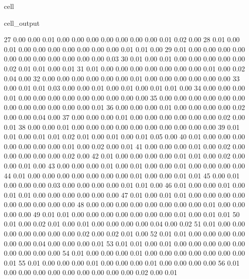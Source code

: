 \documentclass[letterpaper,10pt,english]{jupyterBook}
\begin{document}
\begin{sphinxuseclass}{cell}
\begin{sphinxVerbatimOutput}
\begin{sphinxuseclass}{cell_output}
\begin{sphinxVerbatim}[commandchars=\\\{\}]
        27	0.00 	0.00 	0.01 	0.00 	0.00 	0.00 	0.00 	0.00 	0.00 	0.00 	0.01 	0.02 	0.00
        28	0.01 	0.00 	0.01 	0.00 	0.00 	0.00 	0.00 	0.00 	0.00 	0.00 	0.01 	0.01 	0.00
        29	0.01 	0.00 	0.00 	0.00 	0.00 	0.00 	0.00 	0.00 	0.00 	0.00 	0.00 	0.00 	0.03
        30	0.01 	0.00 	0.01 	0.00 	0.00 	0.00 	0.00 	0.00 	0.02 	0.01 	0.01 	0.00 	0.01
        31	0.01 	0.00 	0.00 	0.00 	0.00 	0.00 	0.00 	0.00 	0.01 	0.00 	0.02 	0.04 	0.00
        32	0.00 	0.00 	0.00 	0.00 	0.00 	0.00 	0.01 	0.00 	0.00 	0.00 	0.00 	0.00 	0.00
        33	0.00 	0.01 	0.01 	0.03 	0.00 	0.00 	0.01 	0.00 	0.01 	0.00 	0.01 	0.01 	0.00
        34	0.00 	0.00 	0.00 	0.01 	0.00 	0.00 	0.00 	0.00 	0.00 	0.00 	0.00 	0.00 	0.00
        35	0.00 	0.00 	0.00 	0.00 	0.00 	0.00 	0.00 	0.00 	0.00 	0.00 	0.00 	0.00 	0.01
        36	0.00 	0.00 	0.00 	0.01 	0.00 	0.00 	0.00 	0.00 	0.02 	0.00 	0.00 	0.04 	0.00
        37	0.00 	0.00 	0.00 	0.01 	0.00 	0.00 	0.00 	0.00 	0.00 	0.00 	0.02 	0.00 	0.01
        38	0.00 	0.00 	0.01 	0.00 	0.00 	0.00 	0.00 	0.00 	0.00 	0.00 	0.00 	0.00 	0.00
        39	0.01 	0.01 	0.00 	0.01 	0.01 	0.02 	0.01 	0.00 	0.01 	0.00 	0.01 	0.05 	0.00
        40	0.01 	0.00 	0.00 	0.00 	0.00 	0.00 	0.00 	0.00 	0.01 	0.00 	0.02 	0.00 	0.01
        41	0.00 	0.00 	0.00 	0.01 	0.00 	0.02 	0.00 	0.00 	0.00 	0.00 	0.00 	0.02 	0.00
        42	0.01 	0.00 	0.00 	0.00 	0.00 	0.01 	0.01 	0.00 	0.02 	0.00 	0.00 	0.01 	0.00
        43	0.00 	0.00 	0.00 	0.01 	0.00 	0.01 	0.00 	0.00 	0.01 	0.00 	0.00 	0.00 	0.00
        44	0.01 	0.00 	0.00 	0.00 	0.00 	0.00 	0.00 	0.00 	0.01 	0.00 	0.00 	0.01 	0.01
        45	0.00 	0.01 	0.00 	0.00 	0.00 	0.03 	0.00 	0.00 	0.00 	0.00 	0.01 	0.01 	0.00
        46	0.01 	0.00 	0.00 	0.01 	0.00 	0.01 	0.01 	0.00 	0.00 	0.00 	0.00 	0.00 	0.00
        47	0.01 	0.00 	0.01 	0.01 	0.00 	0.00 	0.00 	0.00 	0.00 	0.00 	0.00 	0.00 	0.00
        48	0.00 	0.00 	0.00 	0.00 	0.00 	0.00 	0.00 	0.00 	0.01 	0.00 	0.00 	0.00 	0.00
        49	0.01 	0.01 	0.00 	0.00 	0.00 	0.00 	0.00 	0.00 	0.00 	0.01 	0.00 	0.01 	0.01
        50	0.01 	0.00 	0.02 	0.01 	0.00 	0.01 	0.00 	0.00 	0.00 	0.00 	0.04 	0.00 	0.02
        51	0.01 	0.00 	0.00 	0.00 	0.00 	0.00 	0.00 	0.00 	0.02 	0.00 	0.02 	0.01 	0.00
        52	0.01 	0.01 	0.00 	0.00 	0.00 	0.00 	0.00 	0.00 	0.04 	0.00 	0.00 	0.00 	0.01
        53	0.01 	0.01 	0.00 	0.01 	0.00 	0.00 	0.00 	0.00 	0.00 	0.00 	0.00 	0.00 	0.00
        54	0.01 	0.00 	0.00 	0.00 	0.01 	0.00 	0.00 	0.00 	0.00 	0.00 	0.00 	0.00 	0.01
        55	0.01 	0.00 	0.00 	0.00 	0.01 	0.00 	0.00 	0.00 	0.01 	0.00 	0.00 	0.00 	0.00
        56	0.01 	0.00 	0.00 	0.00 	0.00 	0.00 	0.00 	0.00 	0.00 	0.00 	0.02 	0.00 	0.01

\end{sphinxVerbatim}
\end{sphinxuseclass}
\end{sphinxVerbatimOutput}
\end{sphinxuseclass}
\end{document}
